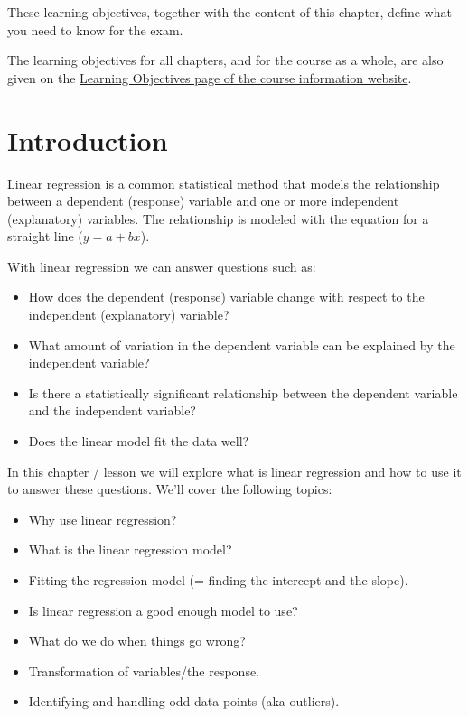 \documentclass[
  letterpaper,
  8pt,
  a4paper]{book}
\providecommand{\tightlist}{%
  \setlength{\itemsep}{0pt}\setlength{\parskip}{0pt}}
\begin{document}
\begin{tcolorbox}
These learning objectives, together with the content of this chapter,
define what you need to know for the exam.

The learning objectives for all chapters, and for the course as a whole,
are also given on the
\href{https://opetchey.github.io/BIO144_Course_Information/3.1-learning-objectives.html}{Learning
Objectives page of the course information website}.

\end{tcolorbox}

\section*{Introduction}\label{introduction}


Linear regression is a common statistical method that models the
relationship between a dependent (response) variable and one or more
independent (explanatory) variables. The relationship is modeled with
the equation for a straight line (\(y = a + bx\)).

With linear regression we can answer questions such as:

\begin{itemize}
\tightlist
\item
  How does the dependent (response) variable change with respect to the
  independent (explanatory) variable?
\item
  What amount of variation in the dependent variable can be explained by
  the independent variable?
\item
  Is there a statistically significant relationship between the
  dependent variable and the independent variable?
\item
  Does the linear model fit the data well?
\end{itemize}

In this chapter / lesson we will explore what is linear regression and
how to use it to answer these questions. We'll cover the following
topics:

\begin{itemize}
\tightlist
\item
  Why use linear regression?
\item
  What is the linear regression model?
\item
  Fitting the regression model (= finding the intercept and the slope).
\item
  Is linear regression a good enough model to use?
\item
  What do we do when things go wrong?
\item
  Transformation of variables/the response.
\item
  Identifying and handling odd data points (aka outliers).
\end{itemize}
\end{document}
